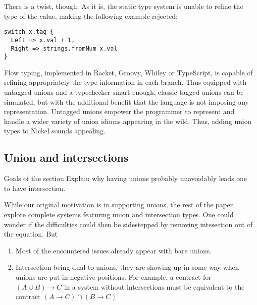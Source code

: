 There is a twist, though. As it is, the static type system is unable to refine
the type of the value, making the following example rejected:

\begin{lstlisting}
switch x.tag {
  Left => x.val + 1,
  Right => strings.fromNum x.val
}
\end{lstlisting}

Flow typing, implemented in Racket\cite{FlowTypingRacket1, FlowTypingRacket2},
Groovy\cite{FlowTypingGroovy}, Whiley\cite{FlowTypingWhiley} or
TypeScript\cite{FlowTypingTypeScript}, is capable of refining appropriately the
type information in each branch. Thus equipped with untagged unions and a
typechecker smart enough, classic tagged unions can be simulated, but with the
additional benefit that the language is not imposing any representation.
Untagged unions empower the programmer to represent and handle a wider variety
of union idioms appearing in the wild.  Thus, adding union types to Nickel
sounds appealing.

\subsection{Union and intersections}
{\color{red}Goals of the section
Explain why having unions probably unavoidably leads one to have intersection.\vspace{0.5cm}}

While our original motivation is in supporting unions, the rest of the paper
explore complete systems featuring union and intersection types. One could
wonder if the difficulties could then be sidestepped by removing intesection out
of the equation. But

\begin{enumerate}
    \item Most of the encountered issues already appear with bare unions.
    \item Intersection being dual to unions, they are showing up in some way
        when unions are put in negative positions. For example, a contract for
        $(A \cup B) \to C$ in a system without intersections must be
        equivalent
        to the contract $(A \to C) \cap (B \to C)$
\end{enumerate}


